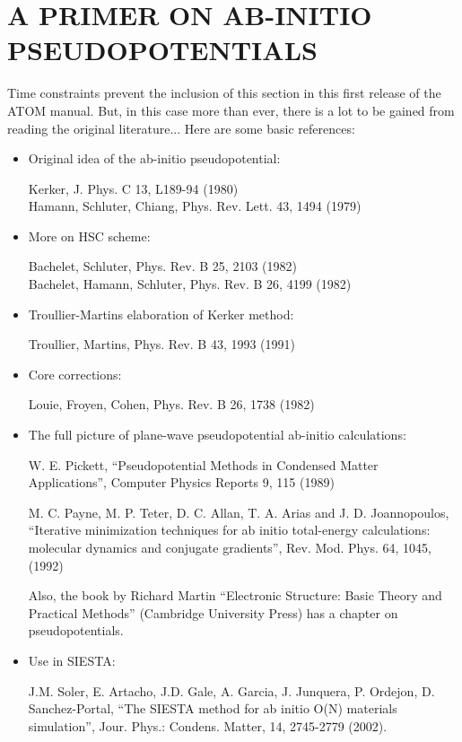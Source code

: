 \documentclass[11pt]{article}
\begin{document}
\section{A PRIMER ON AB-INITIO PSEUDOPOTENTIALS}

Time constraints prevent the inclusion of this section in this first
release of the {\sc ATOM} manual. But, in this case more than ever,
there is a lot to be gained from reading the original literature...
Here are some basic references:

\begin{itemize}
\item Original idea of the ab-initio pseudopotential:

Kerker, J. Phys. C 13, L189-94 (1980)\\
Hamann, Schluter, Chiang, Phys. Rev. Lett. 43, 1494 (1979)

\item More on HSC scheme:

Bachelet, Schluter, Phys. Rev. B 25, 2103 (1982)\\
Bachelet, Hamann, Schluter, Phys. Rev. B 26, 4199 (1982)

\item Troullier-Martins elaboration of Kerker method:

Troullier, Martins, Phys. Rev. B 43, 1993 (1991)\\

\item Core corrections:

Louie, Froyen, Cohen, Phys. Rev. B 26, 1738 (1982)

\item The full picture of plane-wave pseudopotential ab-initio calculations:

W. E. Pickett, ``Pseudopotential Methods in Condensed Matter
Applications'', Computer Physics Reports 9, 115 (1989)

M. C. Payne, M. P. Teter, D. C. Allan, T. A. Arias and
J. D. Joannopoulos, ``Iterative minimization techniques for ab initio
total-energy calculations: molecular dynamics and conjugate
gradients'', Rev. Mod. Phys. 64, 1045, (1992)

Also, the book by Richard Martin
``Electronic Structure: Basic Theory and Practical Methods''
(Cambridge University Press) has a chapter on pseudopotentials.

\item Use in {\sc SIESTA}:

J.M. Soler, E. Artacho, J.D. Gale, A. Garcia, J. Junquera, P. Ordejon,
D. Sanchez-Portal, ``The SIESTA method for ab initio O(N)
materials simulation'', Jour. Phys.: Condens. Matter, 14, 2745-2779
(2002). 

\end{itemize}
\end{document}
